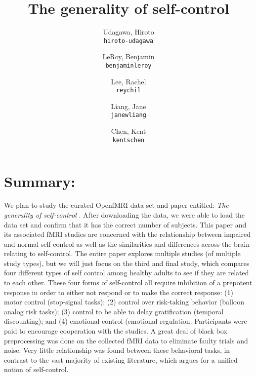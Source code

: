 \documentclass[11pt]{article}
\title{The generality of self-control}
\author{
  Udagawa, Hiroto\\
  \texttt{hiroto-udagawa}
  \and
  LeRoy, Benjamin\\
  \texttt{benjaminleroy}
  \and
  Lee, Rachel\\
  \texttt{reychil}
  \and
  Liang, Jane\\
  \texttt{janewliang}
  \and
  Chen, Kent\\
  \texttt{kentschen}
}
\begin{document}
\maketitle

\section{Summary:}

We plan to study the curated OpenfMRI data set and paper entitled: \textit{The generality of self-control} \cite{lindquist2008statistical}. After downloading the data, we were able to load the data set and confirm that it has the correct number of subjects. This paper and its associated fMRI studies are concerned with the relationship between impaired and normal self control as well as the similarities and differences across the brain relating to self-control. The entire paper explores multiple studies (of multiple study types), but we will just focus on the third and final study, which compares four different types of self control among healthy adults to see if they are related to each other. These four forms of self-control all require inhibition of a prepotent response in order to either not respond or to make the correct response: (1) motor control (stop-signal tasks); (2) control over risk-taking behavior (balloon analog risk tasks); (3) control to be able to delay gratification (temporal discounting); and (4) emotional control (emotional regulation. Participants were paid to encourage cooperation with the studies. A great deal of black box preprocessing was done on the collected fMRI data to eliminate faulty trials and noise. Very little relationship was found between these behavioral tasks, in contrast to the vast majority of existing literature, which argues for a unified notion of self-control.
\end{document}
